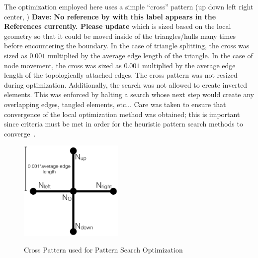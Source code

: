 The optimization employed here uses a simple ``cross'' pattern (up down
left right center, \cite{crossPattern}) {\bf{Dave:  No reference by
with this label appears in the References currently.  Please 
update}} which is sized based on the
local geometry so that it could be moved inside of the triangles/hulls
many times before encountering the boundary. In the case of triangle
splitting, the cross was sized as $0.001$ multiplied by the average edge
length of the triangle. In the case of node movement, the cross was
sized as $0.001$ multiplied by the average edge length of the
topologically attached edges. The cross pattern was not resized during
optimization.  Additionally, the search was not allowed to create
inverted elements.  This was enforced by halting a search whose next
step would create any overlapping edges, tangled elements, etc... Care
was taken to ensure that convergence of the local optimization method
was obtained; this is important since criteria must be met in order for
the heuristic pattern search methods to
converge~\cite{patternsearch2,patternsearch3}.

\begin{figure}
  \begin{center}
  \label{crossPattern}
  \includegraphics[width=50mm]{Figures/crossPattern.png}
  \caption{Cross Pattern used for Pattern Search Optimization}
  \end{center}
\end{figure}

